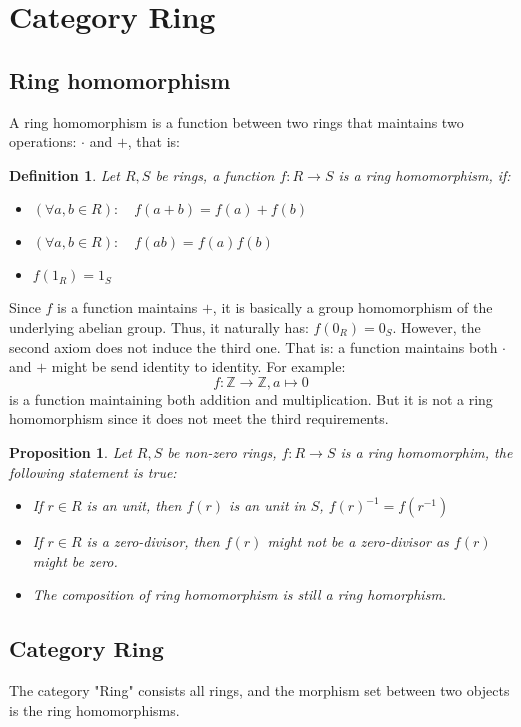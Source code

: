 \documentclass[a4paper, pdf, 11.5pt]{article}
\newtheorem{definition}{Definition}
\newtheorem{prop}{Proposition}
\begin{document}
\section{Category Ring}
\subsection{Ring homomorphism}
A ring homomorphism is a function between two rings that maintains two operations: $\cdot$ and $+$, that is:
\begin{definition}
Let $R, S$ be rings, a function $f: R\rightarrow S$ is a ring homomorphism, if:
\begin{itemize}
  \item  $(\forall a, b\in R):\quad f(a+b) = f(a) + f(b)$
  \item  $(\forall a,b\in R): \quad f(ab) = f(a)f(b)$
  \item  $f(1_{R}) = 1_{S}$
\end{itemize}
\end{definition}
\vspace{0,3cm}

Since $f$ is a function maintains $+$, it is basically a group homomorphism of the underlying abelian group. Thus, it naturally has: $f(0_{R})=0_{S}$. However, the second axiom does not induce the third one. That is: a function maintains both $\cdot$ and $+$ might be send identity to identity. 
For example:
$$
f: \mathbb{Z}\rightarrow \mathbb{Z}, a\mapsto 0
$$
is a function maintaining both addition and multiplication. But it is not a ring homomorphism since it does not meet the 
third requirements.
\begin{prop}
Let $R, S$ be non-zero rings, $f:R\rightarrow S$ is a ring homomorphim, the following statement is true:
\begin{itemize}
  \item  If $r\in R$ is an unit, then $f(r)$ is an unit in $S$, $f(r)^{-1} = f(r^{-1})$
  \item If $r\in R$ is a zero-divisor, then $f(r)$ might not be a zero-divisor as $f(r)$ might be zero. 
  \item The composition of ring homomorphism is still a ring homorphism.
\end{itemize}
\end{prop}
\vspace{0.3cm}

\subsection{Category $\textbf{Ring}$}
The category "Ring" consists all rings, and the morphism set between two objects is the ring homomorphisms. 
\end{document}
